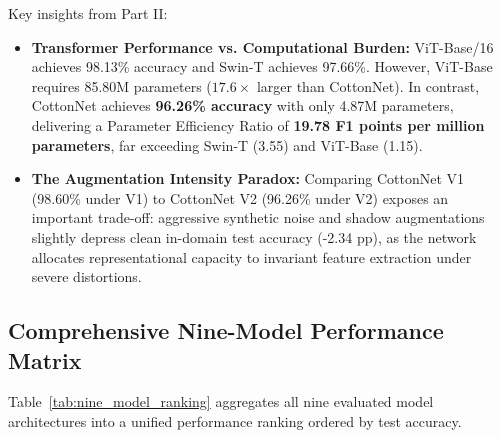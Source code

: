 \documentclass[journal,10pt,twocolumn]{IEEEtran}
\begin{document}
\begin{table}[htbp]
\centering
\caption{Part II extended benchmark results under heavy photometric augmentation.}
\label{tab:part2_results}
\end{table}

Key insights from Part II:
\begin{itemize}[leftmargin=*]
    \item \textbf{Transformer Performance vs. Computational Burden:} ViT-Base/16 achieves 98.13\% accuracy and Swin-T achieves 97.66\%. However, ViT-Base requires 85.80M parameters ($17.6\times$ larger than CottonNet). In contrast, CottonNet achieves \textbf{96.26\% accuracy} with only 4.87M parameters, delivering a Parameter Efficiency Ratio of \textbf{19.78 F1 points per million parameters}, far exceeding Swin-T (3.55) and ViT-Base (1.15).
    \item \textbf{The Augmentation Intensity Paradox:} Comparing CottonNet V1 (98.60\% under V1) to CottonNet V2 (96.26\% under V2) exposes an important trade-off: aggressive synthetic noise and shadow augmentations slightly depress clean in-domain test accuracy (-2.34 pp), as the network allocates representational capacity to invariant feature extraction under severe distortions.
\end{itemize}

\subsection{Comprehensive Nine-Model Performance Matrix}
Table~\ref{tab:nine_model_ranking} aggregates all nine evaluated model architectures into a unified performance ranking ordered by test accuracy.
\end{document}
